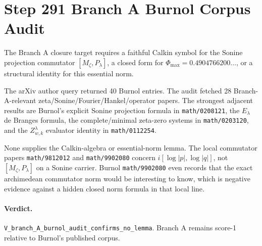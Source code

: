 \documentclass{article}
\begin{document}
\section*{Step 291 Branch A Burnol Corpus Audit}
The Branch A closure target requires a faithful Calkin symbol for the Sonine projection commutator $[M_\zeta,P_\lambda]$, a closed form for $\Phi_{\max}=0.4904766200\ldots$, or a structural identity for this essential norm.

The arXiv author query returned 40 Burnol entries. The audit fetched 28 Branch-A-relevant zeta/Sonine/Fourier/Hankel/operator papers. The strongest adjacent results are Burnol's explicit Sonine projection formula in \texttt{math/0208121}, the $E_\lambda$ de Branges formula, the complete/minimal zeta-zero systems in \texttt{math/0203120}, and the $Z^\lambda_{w,k}$ evaluator identity in \texttt{math/0112254}.

None supplies the Calkin-algebra or essential-norm lemma. The local commutator papers \texttt{math/9812012} and \texttt{math/9902080} concern $i[\log|p|,\log|q|]$, not $[M_\zeta,P_\lambda]$ on a Sonine carrier. Burnol \texttt{math/9902080} even records that the exact archimedean commutator norm would be interesting to know, which is negative evidence against a hidden closed norm formula in that local line.

\paragraph{Verdict.} \texttt{V\_branch\_A\_burnol\_audit\_confirms\_no\_lemma}. Branch A remains score-1 relative to Burnol's published corpus.
\end{document}
